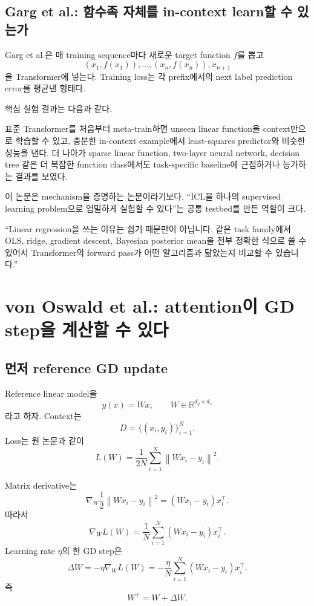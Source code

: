 \documentclass[11pt,a4paper,oneside,openany]{memoir}
\newcommand{\R}{\mathbb{R}}
\newcommand{\norm}[1]{\left\lVert #1\right\rVert}
\theoremstyle{definition}
\begin{document}
\section{Garg et al.: 함수족 자체를 in-context learn할 수 있는가}

Garg et al.은 매 training sequence마다 새로운 target function $f$를 뽑고
\[
(x_1,f(x_1)),\ldots,(x_n,f(x_n)),x_{n+1}
\]
을 Transformer에 넣는다. Training loss는 각 prefix에서의 next label prediction error를 평균낸 형태다.

핵심 실험 결과는 다음과 같다.

\begin{paperbox}
표준 Transformer를 처음부터 meta-train하면 unseen linear function을 context만으로 학습할 수 있고, 충분한 in-context example에서 least-squares predictor와 비슷한 성능을 낸다. 더 나아가 sparse linear function, two-layer neural network, decision tree 같은 더 복잡한 function class에서도 task-specific baseline에 근접하거나 능가하는 결과를 보였다.
\end{paperbox}

이 논문은 mechanism을 증명하는 논문이라기보다, ``ICL을 하나의 supervised learning problem으로 엄밀하게 실험할 수 있다''는 공통 testbed를 만든 역할이 크다.

\begin{presentbox}
``Linear regression을 쓰는 이유는 쉽기 때문만이 아닙니다. 같은 task family에서 OLS, ridge, gradient descent, Bayesian posterior mean을 전부 정확한 식으로 쓸 수 있어서 Transformer의 forward pass가 어떤 알고리즘과 닮았는지 비교할 수 있습니다.''
\end{presentbox}

\chapter{von Oswald et al.: attention이 GD step을 계산할 수 있다}

\section{먼저 reference GD update}

Reference linear model을
\[
y(x)=Wx,
\qquad
W\in\R^{d_y\times d_x}
\]
라고 하자. Context는
\[
D=\{(x_i,y_i)\}_{i=1}^N.
\]
Loss는 원 논문과 같이
\[
L(W)=\frac{1}{2N}\sum_{i=1}^N\norm{Wx_i-y_i}^2.
\]

Matrix derivative는
\[
\nabla_W\frac12\norm{Wx_i-y_i}^2
=(Wx_i-y_i)x_i^\top.
\]
따라서
\[
\nabla_W L(W)
=\frac1N\sum_{i=1}^N(Wx_i-y_i)x_i^\top.
\]
Learning rate $\eta$의 한 GD step은
\[
\Delta W
=-\eta\nabla_WL(W)
=-\frac\eta N\sum_{i=1}^N(Wx_i-y_i)x_i^\top.
\]
즉
\[
W^+=W+\Delta W.
\]
\end{document}
